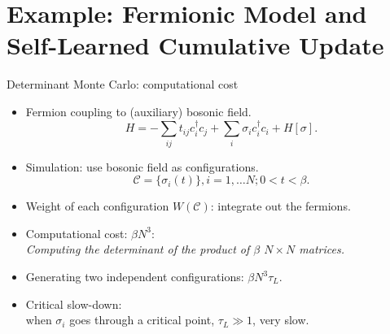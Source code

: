 \documentclass[xcolor=table, 10pt, aspectratio=169]{beamer}
\begin{document}
\section{Example: Fermionic Model and Self-Learned Cumulative Update}

\begin{frame}{Determinant Monte Carlo: computational cost}
\begin{itemize}
  \item Fermion coupling to (auxiliary) bosonic field.
  \[H=-\sum_{ij}t_{ij}c_i^\dagger c_j
  +\sum_i\sigma_ic_i^\dagger c_i
  +H[\sigma].\]
  \item Simulation: use bosonic field as configurations.
  \[\mathcal C=\{\sigma_i(t)\}, i=1,\ldots N;0<t<\beta.\]
  \item Weight of each configuration $W(\mathcal C)$: integrate out the fermions.
  \item Computational cost: $\beta N^3$:\\
  \emph{\small Computing the determinant of the product of $\beta$ $N\times N$ matrices.}
  \item Generating two independent configurations: $\beta N^3\tau_L$.
  \item Critical slow-down:\\ when $\sigma_i$ goes through a critical point, $\tau_L\gg1$, very slow.
\end{itemize}
\end{frame}
\end{document}

